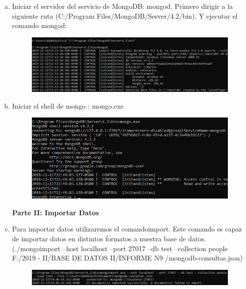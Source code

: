 \documentclass[preprint,12pt]{elsarticle}
\begin{document}
\begin{enumerate}[a)]
\item Iniciar el servidor del servicio de MongoDB: mongod. Primero dirigir a la siguiente ruta (C:/Program Files/MongoDB/Server/4.2/bin). Y ejecutar el comando mongod:
\begin{figure}[htb]
	\begin{center}
		\includegraphics[width=13cm]{./IMAGENES/Mongo04}
	\end{center}
\end{figure}

\item Iniciar el shell de mongo : mongo.exe
\begin{figure}[htb]
	\begin{center}
		\includegraphics[width=13cm]{./IMAGENES/Mongo05}
	\end{center}
\end{figure}

\textbf{Parte II: Importar Datos}
\item Para importar datos utilizaremos el comandoimport. Este comando es capaz de importar datos en distintos formatos a nuestra base de datos.\newline 
(./mongoimport --host localhost --port 27017 --db test --collection people F:/2019 - II/BASE DE DATOS II/INFORME N9 /mongodb-consultas.json)
\begin{figure}[htb]
	\begin{center}
		\includegraphics[width=13cm]{./IMAGENES/Mongo07}
	\end{center}
\end{figure}


\end{enumerate}
\end{document}
